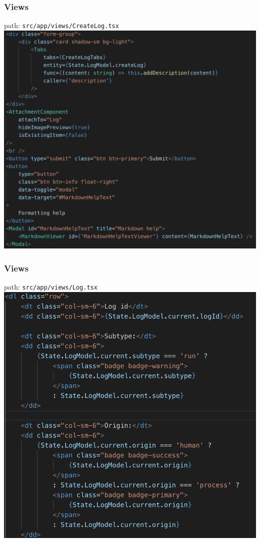 \documentclass[12pt]{beamer}
\begin{document}
	\begin{frame}
		\frametitle{Views}
		path: \texttt{src/app/views/CreateLog.tsx}
		\includegraphics[scale=.3]{../assets/createlog-view.png}
	\end{frame}

	\begin{frame}
		\frametitle{Views}
		path: \texttt{src/app/views/Log.tsx}
		\includegraphics[scale=.3]{../assets/logdetails-view.png}
	\end{frame}
	
\end{document}
